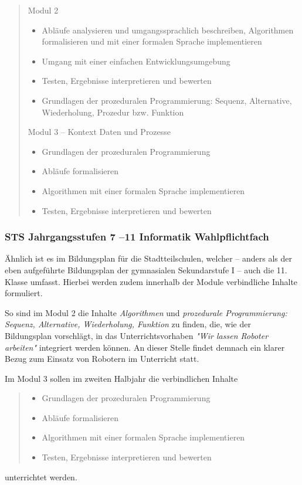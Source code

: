 \documentclass[paper=a4, DIV=calc, BCOR=12mm, twoside=on, onecolumn=on, open = right, titlepage =on, parskip =half-, headsepline = on, footsepline = off, chapterprefix = off, appendixprefix = on, fontsize = 12pt, numbers = noenddot, abstract = on]{scrbook}
\begin{document}
 \begin{quote}
Modul 2
\begin{itemize}
\item Abläufe analysieren und umgangssprachlich beschreiben, Algorithmen formalisieren und mit einer formalen Sprache implementieren
\item Umgang mit einer einfachen Entwicklungsumgebung
\item Testen, Ergebnisse interpretieren und bewerten
\item Grundlagen der prozeduralen Programmierung: Sequenz, Alternative, Wiederholung, Prozedur bzw. Funktion
\end{itemize}

Modul 3 -- Kontext Daten und Prozesse
\begin{itemize}
\item Grundlagen der prozeduralen Programmierung
\item Abläufe formalisieren
\item Algorithmen mit einer formalen Sprache implementieren
\item Testen, Ergebnisse interpretieren und bewerten \qquad \cite{gymsek1:11} 
\end{itemize}
 \end{quote}


\subsubsection{STS Jahrgangsstufen 7 --11 Informatik Wahlpflichtfach}
Ähnlich ist es im Bildungsplan für die Stadtteilschulen, welcher -- anders als der eben aufgeführte Bildungsplan der gymnasialen Sekundarstufe I -- auch die 11. Klasse umfasst. Hierbei werden zudem innerhalb der Module verbindliche Inhalte formuliert.

So sind im Modul 2 die Inhalte \emph{Algorithmen} und \emph{prozedurale Programmierung: Sequenz, Alternative, Wiederholung, Funktion} zu finden, die, wie der Bildungsplan vorschlägt, in das Unterrichtsvorhaben \emph{"Wir lassen Roboter arbeiten"} integriert werden können. An dieser Stelle findet demnach ein klarer Bezug zum Einsatz von Robotern im Unterricht statt.

Im Modul 3 sollen im zweiten Halbjahr die verbindlichen Inhalte
\begin{quote}
\begin{itemize}
\item Grundlagen der prozeduralen Programmierung
\item Abläufe formalisieren
\item Algorithmen mit einer formalen Sprache implementieren
\item Testen, Ergebnisse interpretieren und bewerten \hfill \cite{stsmittel:14}
\end{itemize}
\end{quote}
unterrichtet werden.  
\end{document}
